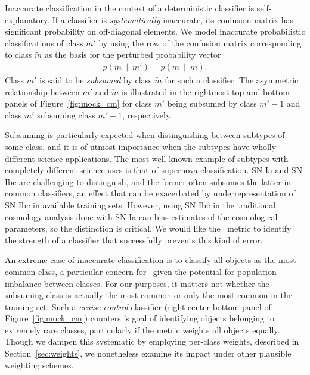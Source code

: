 Inaccurate classification in the context of a deterministic classifier is self-explanatory.
If a classifier is \textit{systematically} inaccurate, its confusion matrix has significant probability on off-diagonal elements.
We model inaccurate probabilistic classifications of class $m'$ by using the row of the confusion matrix corresponding to class $\tilde{m}$ as the basis for the perturbed probability vector
\begin{eqnarray}
  \label{eq:subsume}
  p(m\ \mid\ m') = p(m\ \mid\ \tilde{m}).
\end{eqnarray}
Class $m'$ is said to be \textit{subsumed} by class $\tilde{m}$ for such a classifier.
The asymmetric relationship between $m'$ and $\tilde{m}$ is illustrated in the rightmost top and bottom panels of Figure~\ref{fig:mock_cm} for class $m'$ being subsumed by class $m'-1$ and class $m'$ subsuming class $m'+1$, respectively.

Subsuming is particularly expected when distinguishing between subtypes of some class, and it is of utmost importance when the subtypes have wholly different science applications.
The most well-known example of subtypes with completely different science uses is that of supernova classification.
SN Ia and SN Ibc are challenging to distinguish, and the former often subsumes the latter in common classifiers, an effect that can be exacerbated by underrepresentation of SN Ibc in available training sets.
However, using SN Ibc in the traditional cosmology analysis done with SN Ia can bias estimates of the cosmological parameters, so the distinction is critical.
We would like the \plasticc\ metric to identify the strength of a classifier that successfully prevents this kind of error.

An extreme case of inaccurate classification is to classify all objects as the most common class, a particular concern for \plasticc\ given the potential for population imbalance between classes.
For our purposes, it matters not whether the subsuming class is actually the most common or only the most common in the training set.
Such a \textit{cruise control} classifier (right-center bottom panel of Figure~\ref{fig:mock_cm}) counters \plasticc's goal of identifying objects belonging to extremely rare classes, particularly if the metric weights all objects equally.
Though we dampen this systematic by employing per-class weights, described in Section~\ref{sec:weights}, we nonetheless examine its impact under other plausible weighting schemes.

%

